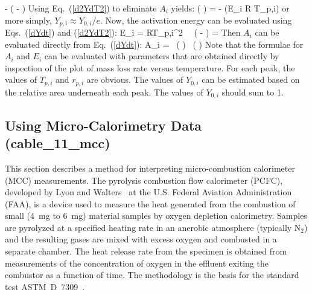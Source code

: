 \documentclass[11pt]{book}
\begin{document}
   \approx -  \; \exp \left( - \right)
\ee
Using Eq.~(\ref{d2YdT2}) to eliminate $A_i$ yields:
\be
   \ln \left(  \right) = -    \quad \quad (E_i  R T_{p,i})
\ee
or more simply, $Y_{p,i} \approx Y_{0,i}/e$. Now, the activation energy can be evaluated using Eqs.~(\ref{dYdt}) and (\ref{d2YdT2}):
\be
   E_i = RT_{p,i}^2 \,  \, \exp \left( - \right) =  
   \approx {}   \label{E_formula}
\ee
Then $A_i$ can be evaluated directly from Eq.~(\ref{dYdt}):
\be
   A_i =  \, \exp \left(  \right) \approx {} \, \exp \left(  \right) \label{A_formula}
\ee
Note that the formulae for $A_i$ and $E_i$ can be evaluated with parameters that are obtained directly by
inspection of the plot of mass loss rate versus temperature.
For each peak, the values of $T_{p,i}$ and $r_{p,i}$ are obvious.
The values of $Y_{0,i}$ can be estimated based on the relative area underneath each peak. The values of $Y_{0,i}$ should sum to 1.



\subsection{Using Micro-Calorimetry Data (\texorpdfstring{{\bf cable\_11\_mcc}}{cable\_11\_mcc})}
\label{cable_11_mcc}

This section describes a method for interpreting micro-combustion calorimeter (MCC) measurements.
The pyrolysis combustion flow calorimeter (PCFC), developed
by Lyon and Walters~\cite{Lyon:JAAP2004} at the U.S. Federal Aviation Administration (FAA), is a device
used to measure the heat generated from the combustion of small (4~mg to 6~mg) material samples by oxygen depletion calorimetry.
Samples are pyrolyzed at a specified heating rate in an anerobic atmosphere (typically N$_2$) and the resulting gases are mixed with
excess oxygen and combusted in a separate chamber. The heat release rate from the specimen is obtained from measurements of the
concentration of oxygen in the effluent exiting the combustor as a function of time. The methodology is the basis for
the standard test ASTM~D~7309~\cite{ASTM:D7309}.
\end{document}
